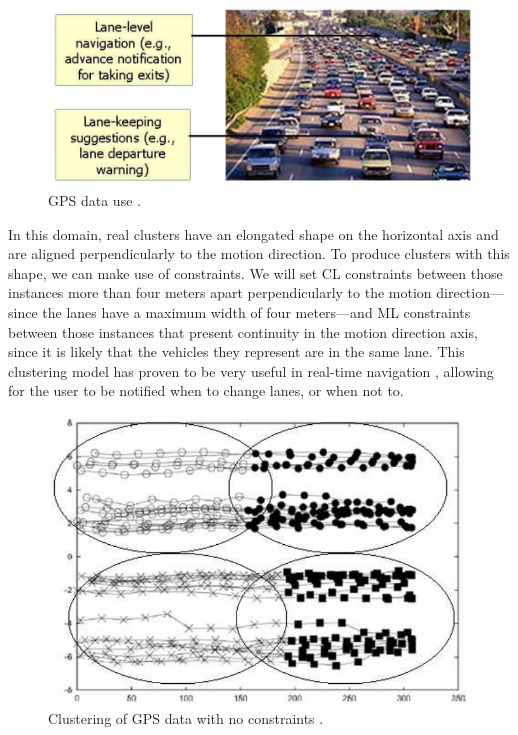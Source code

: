 \begin{figure}[!h]
	\centering
	\includegraphics[scale=0.3]{gfx/ConstClust/GPS/Coches} 
	\caption[\acs{GPS} data use.]{\acs{GPS} data use \cite{davidson2007survey, wagstaff2001constrained}.}\label{fig:GPSClustData}
\end{figure}

In this domain, real clusters have an elongated shape on the horizontal axis and are aligned perpendicularly to the motion direction. To produce clusters with this shape, we can make use of constraints. We will set \acs{CL} constraints between those instances more than four meters apart perpendicularly to the motion direction---since the lanes have a maximum width of four meters---and \acs{ML} constraints between those instances that present continuity in the motion direction axis, since it is likely that the vehicles they represent are in the same lane. This clustering model has proven to be very useful in real-time navigation \cite{wagstaff2001constrained}, allowing for the user to be notified when to change lanes, or when not to.

\begin{figure}[!h]
	\centering
	\includegraphics[scale=0.32]{gfx/ConstClust/GPS/Instancias} 
	\caption[Clustering of \acs{GPS} data with no constraints.]{Clustering of \acs{GPS} data with no constraints \cite{davidson2007survey,wagstaff2001constrained}.}\label{fig:figure15}
\end{figure}

